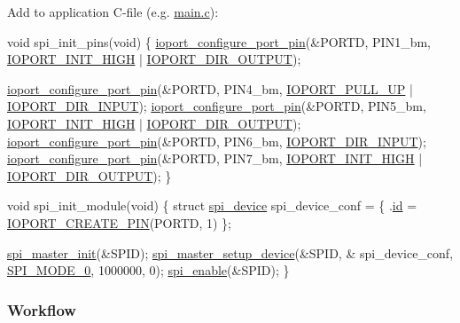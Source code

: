 Add to application C-\/file (e.\-g. \hyperlink{main_8c}{main.\-c})\-: 
\begin{DoxyCode}
           \textcolor{keywordtype}{void} spi\_init\_pins(\textcolor{keywordtype}{void})
           \{
               \hyperlink{ioport__compat_8h_a8da4959022f2cec05f59a9939671ff7e}{ioport\_configure\_port\_pin}(&PORTD, 
      PIN1\_bm, \hyperlink{ioport__compat_8h_a6fd5b83fc296e4d6d791f8b074731d8e}{IOPORT\_INIT\_HIGH} | \hyperlink{group__ioport__group_gga9c267f89800e58bd9dfd74e662a4a4c1a06de24313dad0169f3a366c62a84f4cc}{IOPORT\_DIR\_OUTPUT});

               \hyperlink{ioport__compat_8h_a8da4959022f2cec05f59a9939671ff7e}{ioport\_configure\_port\_pin}(&PORTD, 
      PIN4\_bm, \hyperlink{ioport__compat_8h_acbd350ec39fe567a7c0e423b000746fb}{IOPORT\_PULL\_UP} | \hyperlink{group__ioport__group_gga9c267f89800e58bd9dfd74e662a4a4c1af854a0dce084e5a8e8744f9a502e7b7b}{IOPORT\_DIR\_INPUT});
               \hyperlink{ioport__compat_8h_a8da4959022f2cec05f59a9939671ff7e}{ioport\_configure\_port\_pin}(&PORTD, 
      PIN5\_bm, \hyperlink{ioport__compat_8h_a6fd5b83fc296e4d6d791f8b074731d8e}{IOPORT\_INIT\_HIGH} | \hyperlink{group__ioport__group_gga9c267f89800e58bd9dfd74e662a4a4c1a06de24313dad0169f3a366c62a84f4cc}{IOPORT\_DIR\_OUTPUT});
               \hyperlink{ioport__compat_8h_a8da4959022f2cec05f59a9939671ff7e}{ioport\_configure\_port\_pin}(&PORTD, 
      PIN6\_bm, \hyperlink{group__ioport__group_gga9c267f89800e58bd9dfd74e662a4a4c1af854a0dce084e5a8e8744f9a502e7b7b}{IOPORT\_DIR\_INPUT});
               \hyperlink{ioport__compat_8h_a8da4959022f2cec05f59a9939671ff7e}{ioport\_configure\_port\_pin}(&PORTD, 
      PIN7\_bm, \hyperlink{ioport__compat_8h_a6fd5b83fc296e4d6d791f8b074731d8e}{IOPORT\_INIT\_HIGH} | \hyperlink{group__ioport__group_gga9c267f89800e58bd9dfd74e662a4a4c1a06de24313dad0169f3a366c62a84f4cc}{IOPORT\_DIR\_OUTPUT});
           \}

           \textcolor{keywordtype}{void} spi\_init\_module(\textcolor{keywordtype}{void})
           \{
              \textcolor{keyword}{struct }\hyperlink{structspi__device}{spi\_device} spi\_device\_conf = \{
                  .\hyperlink{structspi__device_a46fd65e51a4d6c4d6056639a4f154186}{id} = \hyperlink{group__ioport__group_gabc09edad7c3187dec63ce47e6f1b3c51}{IOPORT\_CREATE\_PIN}(PORTD, 1)
              \};

              \hyperlink{group__xmega__spi__master__group_ga3238676989038a9dec0ebcd3aa625a42}{spi\_master\_init}(&SPID);
              \hyperlink{group__xmega__spi__master__group_ga81164f6dd2297a64337f3a052171e0f8}{spi\_master\_setup\_device}(&SPID, &
      spi\_device\_conf, \hyperlink{group__xmega__spi__master__group_ga1ec07ad94d5f6276c1c0b41d0550fe52}{SPI\_MODE\_0}, 1000000, 0);
              \hyperlink{group__xmega__spi__master__group_ga82974e81370360e53b1276113de8a462}{spi\_enable}(&SPID);
           \}
\end{DoxyCode}
\hypertarget{spi_master_xmega_spi_master_xmega_basic_setup}{}\subsubsection{Workflow}\label{spi_master_xmega_spi_master_xmega_basic_setup}

